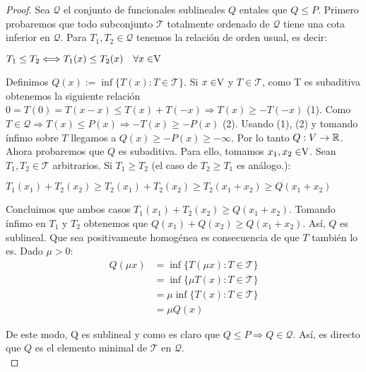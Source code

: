 	\begin{proof}
		Sea $ \mathcal{Q} $ el conjunto de funcionales sublineales $ Q $ en\vecSpace tales que $ Q \leq P $. Primero probaremos que todo subconjunto $ \mathcal{T} $ totalmente ordenado de $ \mathcal{Q} $ tiene una cota inferior en $ \mathcal{Q} $. Para $ T_1 ,T_2 \in \mathcal{Q} $ tenemos la relación de orden usual, es decir:
		\begin{center}
			$ T_1 \leq T_2 \Longleftrightarrow T_1 (x) \leq T_2 (x) \quad \forall x \in \vecSpace $
		\end{center}
		
		Definimos $ Q(x):=\inf \{ T(x): T \in \mathcal{T} \} $. Si $ x \in \vecSpace $ y $ T \in \mathcal{T} $, como T es subaditiva obtenemos la siguiente relación $ 0 = T(0) = T(x-x) \leq T(x) + T(-x) \Longrightarrow T(x) \geq -T(-x) $ (1). Como $ T \in \mathcal{Q} \Longrightarrow T(x) \leq P(x) \Longrightarrow -T(x) \geq -P(x)$ (2). Usando (1), (2) y tomando ínfimo sobre $  T $  llegamos a $ Q(x) \geq -P(x) \geq - \infty $. Por lo tanto $ Q:V \rightarrow \mathbb{R}$. \\
		
		Ahora probaremos que $ Q $ es subaditiva. Para ello, tomamos $ x_1, x_2\in \vecSpace $. Sean $ T_1 , T_2 \in \mathcal{T} $ arbitrarios. Si $ T_1 \geq T_2 $ (el caso de $ T_2 \geq T_1 $ es análogo.):
		
		\begin{center}
			$ T_1 (x_1)+  T_2 (x_2) \geq T_2(x_1)+  T_2 (x_2) \geq T_2(x_1 +x_2) \geq Q(x_1 + x_2)$
		\end{center}
		
		Concluimos que ambos casos $ T_1 (x_1)+  T_2 (x_2) \geq Q(x_1 + x_2)$. Tomando ínfimo en $ T_1 $ y $ T_2 $ obtenemos que $ Q (x_1)+  Q(x_2) \geq Q(x_1 + x_2)$. Así, $ Q $ es sublineal. Que sea positivamente homogénea es consecuencia de que $ T $ también lo es. Dado $ \mu > 0 $:
		\begin{equation*}
		\begin{split}
		Q(\mu x) &=\inf \{ T(\mu x): T \in \mathcal{T} \} \\ 
		& = \inf \{ \mu T( x): T \in \mathcal{T} \} \\ 
		&= \mu\inf \{ T( x): T \in \mathcal{T} \} \\ 
		&= \mu Q(x) 
		\end{split}
		\end{equation*}
		
		De este modo, Q es sublineal y como es claro que $ Q \leq P \Longrightarrow Q \in \mathcal{Q}$. Así, es directo que $ Q $ es el elemento minimal de $ \mathcal{T} $ en $\mathcal{Q}$.\\
		

\end{proof}

